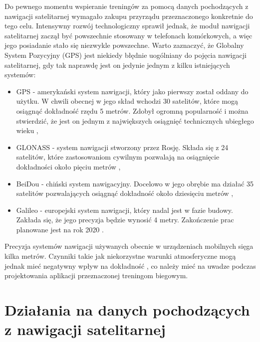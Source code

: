 Do pewnego momentu wspieranie treningów za pomocą danych pochodzących z nawigacji satelitarnej wymagało zakupu przyrządu przeznaczonego konkretnie do tego celu. Intensywny rozwój technologiczny sprawił jednak, że moduł nawigacji satelitarnej zaczął być powszechnie stosowany w telefonach komórkowych, a więc jego posiadanie stało się niezwykle powszechne. Warto zaznaczyć, że Globalny System Pozycyjny (GPS) jest niekiedy błędnie uogólniany do pojęcia nawigacji satelitarnej, gdy tak naprawdę jest on jedynie jednym z kilku istniejących systemów:
\begin{itemize}
\item{GPS} - amerykański system nawigacji, który jako pierwszy został oddany do użytku. W chwili obecnej w jego skład wchodzi 30 satelitów, które mogą osiągnąć dokładność rzędu 5 metrów. Zdobył ogromną popularność i można stwierdzić, że jest on jednym z największych osiągnięć technicznych ubiegłego wieku \cite{gpsgov},
\item{GLONASS} - system nawigacji stworzony przez Rosję. Składa się z 24 satelitów, które zastosowaniom cywilnym pozwalają na osiągnięcie dokładności około pięciu metrów \cite{gps2},
\item{BeiDou} - chiński system nawigacyjny. Docelowo w jego obrębie ma działać 35 satelitów pozwalających osiągnąć dokładność około dziesięciu metrów \cite{gps2,baidu1},
\item{Galileo} - europejski system nawigacji, który nadal jest w fazie budowy. Zakłada się, że jego precyzja będzie wynosić 4 metry. Zakończenie prac planowane jest na rok 2020 \cite{stronkagps1,gps2}.
\end{itemize}
Precyzja systemów nawigacji używanych obecnie w urządzeniach mobilnych sięga kilka metrów. Czynniki takie jak niekorzystne warunki atmosferyczne mogą jednak mieć negatywny wpływ na dokładność \cite{gps2}, co należy mieć na uwadze podczas projektowania aplikacji przeznaczonej treningom biegowym.

\section{Działania na danych pochodzących z nawigacji satelitarnej}
